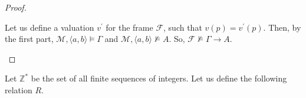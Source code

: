 \documentclass[a4paper]{article}
\theoremstyle{defin}
\theoremstyle{theorem}
\theoremstyle{prop}
\theoremstyle{lemma}
\theoremstyle{ex}
\theoremstyle{col}
\begin{document}
\begin{proof}
\begin{enumerate}
    Let us define a valuation $v^{'}$ for the frame $\mathcal{F}$, such that $v(p) = v^{'}(p)$. Then, by the first part, $\mathcal{M}, \langle a, b \rangle \models \Gamma$ and $\mathcal{M}, \langle a, b\rangle\not\models A$. So, $\mathcal{F}\not\models \Gamma \to A$.
  \end{enumerate}
\end{proof}


Let $\mathbb{Z}^{*}$ be the set of all finite sequences of integers. Let us define the following relation $R$.
\end{document}
